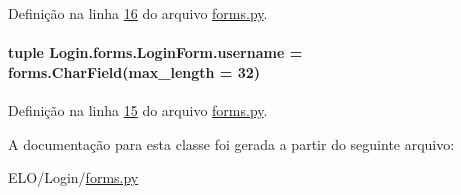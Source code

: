 Definição na linha \hyperlink{Login_2forms_8py_source_l00016}{16} do arquivo \hyperlink{Login_2forms_8py_source}{forms.\+py}.

\hypertarget{classLogin_1_1forms_1_1LoginForm_af3766bb4ea8cabdf57ad77214b7545fd}{}
\paragraph[{username}]{\setlength{\rightskip}{0pt plus 5cm}tuple Login.\+forms.\+Login\+Form.\+username = forms.\+Char\+Field(max\+\_\+length = 32)\hspace{0.3cm}{\ttfamily [static]}}\label{classLogin_1_1forms_1_1LoginForm_af3766bb4ea8cabdf57ad77214b7545fd}


Definição na linha \hyperlink{Login_2forms_8py_source_l00015}{15} do arquivo \hyperlink{Login_2forms_8py_source}{forms.\+py}.



A documentação para esta classe foi gerada a partir do seguinte arquivo\+:\begin{DoxyCompactItemize}
\item 
E\+L\+O/\+Login/\hyperlink{Login_2forms_8py}{forms.\+py}\end{DoxyCompactItemize}
